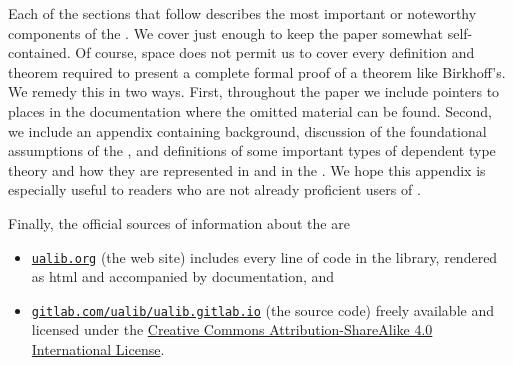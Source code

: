 Each of the sections that follow describes the most important or noteworthy components of the \ualib. We cover just enough to keep the paper somewhat self-contained.  Of course, space does not permit us to cover every definition and theorem required to present a complete formal proof of a theorem like Birkhoff's.  We remedy this in two ways. First, throughout the paper we include pointers to places in the documentation where the omitted material can be found.  Second, we include an appendix containing \agda background, discussion of the foundational assumptions of the \ualib, and definitions of some important types of dependent type theory and how they are represented in \agda and in the \ualib.  We hope this appendix is especially useful to readers who are not already proficient users of \agda.



Finally, the official sources of information about the \agdaualib are
\begin{itemize}
  \item \href{https://ualib.gitlab.io}{\texttt{ualib.org}} (the web site) includes every line of code in the library, rendered as html and accompanied by documentation, and
  \item \href{https://gitlab.com/ualib/ualib.gitlab.io}{\texttt{gitlab.com/ualib/ualib.gitlab.io}} (the source code) freely available and licensed under the \href{https://creativecommons.org/licenses/by-sa/4.0/}{Creative Commons Attribution-ShareAlike 4.0 International License}.
\end{itemize}
